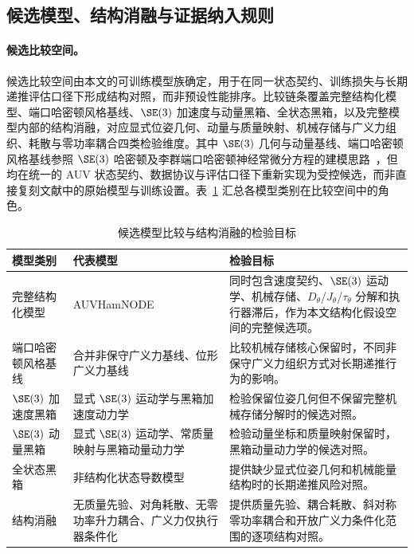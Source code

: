\subsection{候选模型、结构消融与证据纳入规则}
\label{subsec:candidates-evidence}

\paragraph{候选比较空间。}候选比较空间由本文的可训练模型族确定，用于在同一状态契约、训练损失与长期递推评估口径下形成结构对照，而非预设性能排序。比较链条覆盖完整结构化模型、端口哈密顿风格基线、\(\SE(3)\) 加速度与动量黑箱、全状态黑箱，以及完整模型内部的结构消融，对应显式位姿几何、动量与质量映射、机械存储与广义力组织、耗散与零功率耦合四类检验维度。其中 \(\SE(3)\) 几何与动量基线、端口哈密顿风格基线参照 \(\SE(3)\) 哈密顿及李群端口哈密顿神经常微分方程的建模思路~\citep{duong2021se3hamnode,duong2024liegroupphnode}，但均在统一的 AUV 状态契约、数据协议与评估口径下重新实现为受控候选，而非直接复刻文献中的原始模型与训练设置。表~\ref{tab:model-comparison-roles} 汇总各模型类别在比较空间中的角色。

\begin{table}[htbp]
  \centering
  \caption{候选模型比较与结构消融的检验目标}
  \label{tab:model-comparison-roles}
  \begin{tabularx}{\textwidth}{>{\raggedright\arraybackslash}p{}>{\raggedright\arraybackslash}p{}>{\raggedright\arraybackslash}X}
    \toprule
    模型类别 & 代表模型 & 检验目标 \\
    \midrule
    完整结构化模型 & AUVHamNODE & 同时包含速度契约、\(\SE(3)\) 运动学、机械存储、\(D_\theta\)/\(J_\theta\)/\(\tau_\theta\) 分解和执行器滞后，作为本文结构化假设空间的完整候选项。 \\
    端口哈密顿风格基线 & 合并非保守广义力基线、位形广义力基线 & 比较机械存储核心保留时，不同非保守广义力组织方式对长期递推行为的影响。 \\
    \(\SE(3)\) 加速度黑箱 & 显式 \(\SE(3)\) 运动学与黑箱加速度动力学 & 检验保留位姿几何但不保留完整机械存储分解时的候选对照。 \\
    \(\SE(3)\) 动量黑箱 & 显式 \(\SE(3)\) 运动学、常质量映射与黑箱动量动力学 & 检验动量坐标和质量映射保留时，黑箱动量动力学的候选对照。 \\
    全状态黑箱 & 非结构化状态导数模型 & 提供缺少显式位姿几何和机械能量结构时的长期递推风险对照。 \\
    结构消融 & 无质量先验、对角耗散、无零功率升力耦合、广义力仅执行器条件化 & 提供质量先验、耦合耗散、斜对称零功率耦合和开放广义力条件化范围的逐项结构对照。 \\
    \bottomrule
  \end{tabularx}
\end{table}

